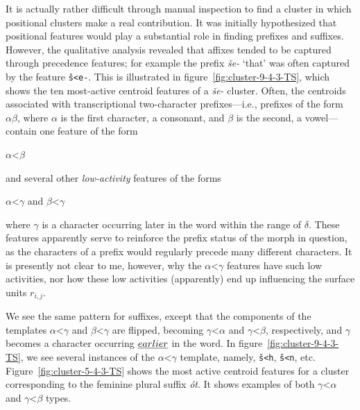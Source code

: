 It is actually rather difficult through manual inspection to find a cluster in which positional clusters make a real contribution. 
It was initially hypothesized that positional features would play a substantial role in
finding prefixes and suffixes. However, the qualitative analysis revealed that affixes tended to be captured through 
precedence features; for example the prefix \textit{\v{s}e-} `that'  was often captured by the feature \texttt{\v{s}<e-}. This is illustrated in figure~\ref{fig:cluster-9-4-3-TS}, which shows the ten most-active centroid features of a \textit{\v{s}e-} cluster.
 Often, the centroids associated with transcriptional two-character prefixes---i.e., prefixes of the form
$\alpha\beta$,
where $\alpha$ is the first character, a consonant, and $\beta$ is the second, a vowel---
contain one feature of the form 
\begin{center}
$\alpha$<$\beta$ 
\end{center}
and several other \emph{low-activity} features
of the forms 
\begin{center}
$\alpha$<$\gamma$ \quad and \quad $\beta$<$\gamma$  
\end{center}
where $\gamma$ is a character occurring later in the word within the range of $\delta$. These features apparently serve to reinforce the prefix status of the morph in question, as the characters of a prefix would regularly precede many different characters. It is presently not clear to me, however, why the $\alpha$<$\gamma$ features have such low activities, nor how these low activities (apparently) end up influencing the surface units $r_{i,j}$.

We see the same pattern for suffixes, except that the components of the templates $\alpha$<$\gamma$ and $\beta$<$\gamma$ are flipped, becoming $\gamma$<$\alpha$ and $\gamma$<$\beta$, respectively, and $\gamma$ becomes a character occurring $\emph{earlier}$ in the word. In figure~\ref{fig:cluster-9-4-3-TS}, we see several instances of the $\alpha$<$\gamma$ template, namely, \texttt{\v{s}<h}, \texttt{\v{s}<n}, etc. Figure~\ref{fig:cluster-5-4-3-TS} shows the most active centroid features for a cluster corresponding to the feminine plural suffix \textit{\'{o}t}. It shows examples of both $\gamma$<$\alpha$ and $\gamma$<$\beta$ types.

